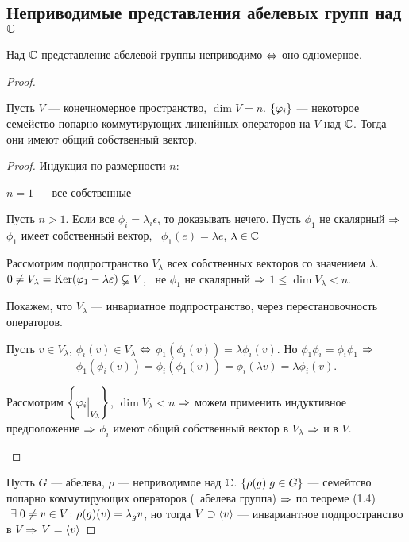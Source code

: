\subsection{Неприводимые представления абелевых групп над $\mathbb{C}$}
\begin{theorem}
	Над $\mathbb{C}$ представление абелевой группы неприводимо $\Leftrightarrow$
	оно одномерное.
\end{theorem}
\begin{proof}
	\begin{theorem}
		Пусть $V$ --- конечномерное пространство, $\dim V = n$.
		$\left\{\varphi_i\right\}$ --- некоторое семейство попарно коммутирующих линенйных
		операторов на $V$ над $\mathbb{C}$.
		Тогда они имеют общий собственный вектор.
	\end{theorem}
	\begin{proof}
		Индукция по размерности $n$:
		\begin{points}{-3}
			\item $n = 1$ --- все собственные
			\item Пусть $n > 1$. Если все $\phi_i = \lambda_i \epsilon$, то доказывать нечего.
				Пусть $\phi_1$ не скалярный $\Rightarrow$
				$\phi_1$ имеет собственный вектор, \ie\
				$\phi_1(e) = \lambda e$, $\lambda \in \mathbb{C}$

				Рассмотрим подпространство $V_{\lambda}$ всех собственных векторов
					со значением $\lambda$.
				$0 \ne V_{\lambda} = \operatorname{Ker} (\varphi_1 - \lambda \varepsilon) \varsubsetneq V$, \bt\
				не $\phi_1$ не скалярный $\Rightarrow$ $1 \le \dim V_{\lambda} < n$.

				Покажем, что $V_{\lambda}$ --- инвариатное подпространство, через перестановочность операторов.

				Пусть $v \in V_{\lambda}$, $\phi_i(v) \in V_{\lambda}$ $\Leftrightarrow$
				$\phi_1(\phi_i(v)) = \lambda \phi_i(v)$.
				Но $\phi_1 \phi_i = \phi_i \phi_1$ $\Rightarrow$
				$$
					\phi_1(\phi_i(v)) = \phi_i(\phi_1(v)) = 
					\phi_i(\lambda v ) = \lambda \phi_i(v).
				$$

				Рассмотрим $\hc{\phi_i\evn{V_{\lambda}}}$, $\dim V_{\lambda} < n$ $\Rightarrow$
				можем применить индуктивное предположение $\Rightarrow$
				$\phi_i$ имеют общий собственный вектор в $V_{\lambda}$ $\Rightarrow$ и в $V$.
		\end{points}
	\end{proof}

	Пусть $G$ --- абелева, $\rho$ --- неприводимое над $\mathbb{C}$.
	$\left\{\rho(g) | g \in G\right\}$ --- семейтсво попарно коммутирующих операторов (\bt\ абелева группа) $\Rightarrow$
	по теореме (1.4) $~\exists\; 0 \ne v \in V \colon \rho(g)(v) = \lambda_g v$,
	но тогда $V \supset \left\langle v\right\rangle$ --- инвариантное подпространство в $V$ $\Rightarrow$ $V = \left\langle v\right\rangle$
\end{proof}

